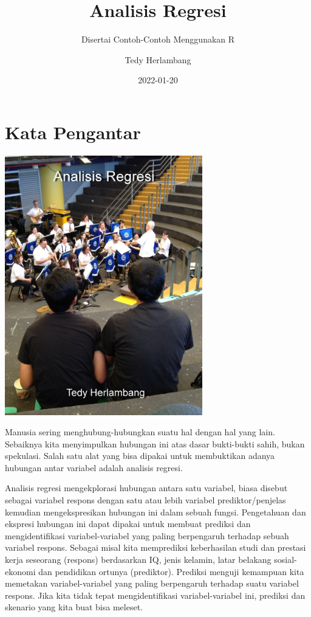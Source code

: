 \documentclass[
]{book}
\title{Analisis Regresi}
\subtitle{Disertai Contoh-Contoh Menggunakan R}
\author{Tedy Herlambang}
\date{2022-01-20}
\begin{document}
\maketitle

{
\setcounter{tocdepth}{1}
\tableofcontents
}
\hypertarget{kata-pengantar}{%
\chapter*{Kata Pengantar}\label{kata-pengantar}}

\includegraphics[width=3.38542in,height=\textheight]{images/analisisregresi.jpg}

Manusia sering menghubung-hubungkan suatu hal dengan hal yang lain. Sebaiknya kita menyimpulkan hubungan ini atas dasar bukti-bukti sahih, bukan spekulasi. Salah satu alat yang bisa dipakai untuk membuktikan adanya hubungan antar variabel adalah analisis regresi.

Analisis regresi mengekplorasi hubungan antara satu variabel, biasa disebut sebagai variabel respons dengan satu atau lebih variabel prediktor/penjelas kemudian mengekspresikan hubungan ini dalam sebuah fungsi. Pengetahuan dan ekspresi hubungan ini dapat dipakai untuk membuat prediksi dan mengidentifikasi variabel-variabel yang paling berpengaruh terhadap sebuah variabel respons. Sebagai misal kita memprediksi keberhasilan studi dan prestasi kerja seseorang (respons) berdasarkan IQ, jenis kelamin, latar belakang sosial-ekonomi dan pendidikan ortunya (prediktor). Prediksi menguji kemampuan kita memetakan variabel-variabel yang paling berpengaruh terhadap suatu variabel respons. Jika kita tidak tepat mengidentifikasi variabel-variabel ini, prediksi dan skenario yang kita buat bisa meleset.
\end{document}
